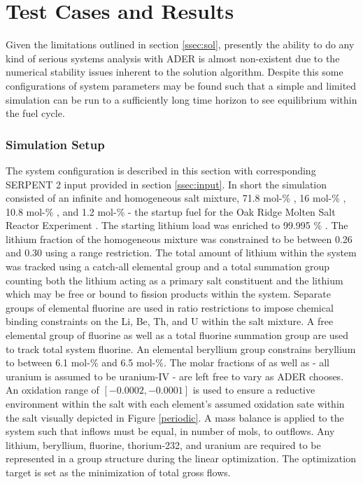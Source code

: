 \chapter{Test Cases and Results}
\label{sec:results}

Given the limitations outlined in section \ref{ssec:sol}, presently the ability
to do any kind of serious systems analysis with ADER is almost non-existent due
to the numerical stability issues inherent to the solution algorithm. Despite
this some configurations of system parameters may be found such that a simple
and limited simulation can be run to a sufficiently long time horizon to see
equilibrium within the fuel cycle.

\subsection{Simulation Setup}\label{ssec:setup}
The system configuration is described in this section with corresponding 
SERPENT 2
input provided in section \ref{ssec:input}. In short the simulation consisted
of an infinite and homogeneous salt mixture, 71.8 mol-\% , 16 mol-\%
, 10.8 mol-\% , and 1.2 mol-\%  - the startup
fuel for the Oak Ridge Molten Salt Reactor Experiment \cite{ORNL}. The starting
lithium load was enriched to 99.995 \% . The lithium
fraction of the homogeneous mixture was constrained to be between 0.26 and 0.30
using a range restriction. The total amount of lithium within the system was
tracked using a catch-all elemental group and a total summation group counting
both the lithium acting as a primary salt constituent and the lithium which may
be free or bound to fission products within the system. Separate groups of
elemental fluorine are used in ratio restrictions to impose chemical binding 
constraints on the Li, Be, Th, and U within the salt mixture. A free elemental
group of fluorine as well as a total fluorine summation group are used to track
total system fluorine. An elemental beryllium group constrains beryllium to
between 6.1 mol-\% and 6.5 mol-\%. The molar fractions of  as well
as  - all uranium is assumed to be uranium-IV - are left free to vary
as ADER chooses. An oxidation range of $[-0.0002, -0.0001]$ is used to ensure
a reductive environment within the salt with each element's assumed oxidation
sate within the salt visually depicted in Figure \ref{periodic}. 
A mass balance is applied to the
system such that inflows must be equal, in number of mols, to outflows. Any
lithium, beryllium, fluorine, thorium-232, and uranium are required to be
represented in a group structure during the linear optimization. The
optimization target is set as the minimization of total gross flows.

